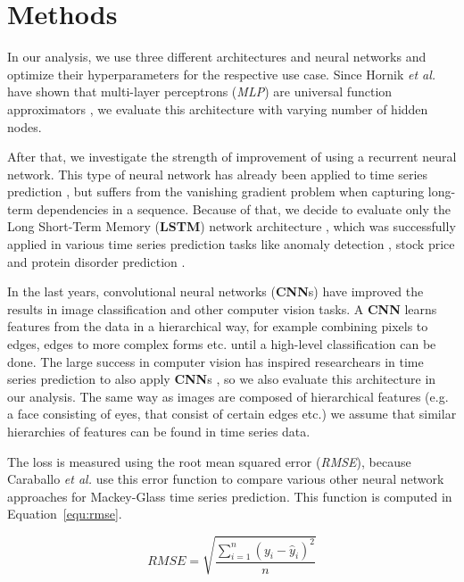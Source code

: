 \documentclass{article}
\begin{document}
\section{Methods}

In our analysis, we use three different architectures and neural networks and
optimize their hyperparameters for the respective use case. Since Hornik
\textit{et al.} have shown that multi-layer perceptrons (\emph{MLP})
are universal
function approximators \cite{hornik1989}, we evaluate this architecture with
varying number of hidden nodes.

After that, we investigate the strength of
improvement of using a recurrent neural network. This type of neural network has
already been applied to time series prediction \cite{connor1994}, but suffers
from the vanishing gradient problem when capturing long-term dependencies in a
sequence. Because of that, we decide to evaluate only the Long Short-Term Memory
(\textbf{LSTM})
network architecture \cite{hochreiter1997}, which was successfully applied in
various time series prediction tasks like anomaly detection \cite{malhotra2015},
stock price \cite{fischer2018} and protein disorder prediction
\cite{hanson2016}.

In the last years, convolutional neural networks (\textbf{CNN}s) have improved
the results in image classification \cite{krizhevsky2012} and other computer
vision tasks. A \textbf{CNN} learns features from the data in a hierarchical
way, for example combining pixels to edges, edges to more complex forms etc.
until a high-level classification can be done. The large success in computer
vision has inspired researchears in time series prediction to also apply
\textbf{CNN}s \cite{cui2016, borovykh2017}, so we also evaluate this
architecture in our analysis. The same way as images are composed of
hierarchical features (e.g. a face consisting of eyes, that consist of
certain edges etc.) we assume that similar hierarchies of features can be found
in time series data.

The loss is measured using the root mean squared error (\emph{RMSE}), because
Caraballo \textit{et al.} \cite{caraballo2016} use this error function to
compare various other neural network approaches for Mackey-Glass time series
prediction. This function is computed in Equation~\ref{equ:rmse}.

\begin{equation}
    RMSE = \sqrt{\frac{\sum_{i=1}^n (y_i - \hat{y}_i)^2}{n}}
    \label{equ:rmse}
\end{equation}
\end{document}
